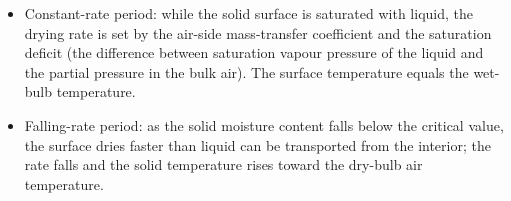 \begin{itemize}[leftmargin=*]
  \item Constant-rate period: while the solid surface is saturated
    with liquid, the drying rate is set by the air-side mass-transfer
    coefficient and the saturation deficit (the difference between
    saturation vapour pressure of the liquid and the partial pressure
    in the bulk air). The surface temperature equals the wet-bulb
    temperature.
  \item Falling-rate period: as the solid moisture content falls
    below the critical value, the surface dries faster than liquid
    can be transported from the interior; the rate falls and the
    solid temperature rises toward the dry-bulb air temperature.
\end{itemize}





